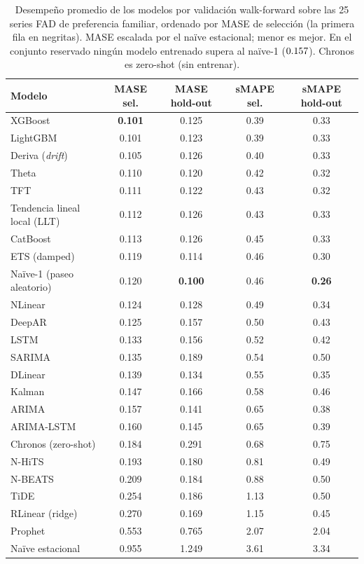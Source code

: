 \documentclass[12pt,letterpaper]{report}
\begin{document}
\begin{table}[H]
\centering
\footnotesize
\caption[Comparación de los \factNModels{} modelos]{Desempeño promedio de los \factNModels{} modelos por
validación walk-forward sobre las 25 series FAD de preferencia familiar, ordenado por MASE
de selección (la primera fila en negritas). MASE escalada por el naïve estacional; menor es
mejor. En el conjunto reservado ningún modelo entrenado supera al naïve-1 ($0.157$).
Chronos es zero-shot (sin entrenar).}
\label{tab:comparacion_modelos}
\begin{tabular}{lcccc}
\toprule
\rowcolor{uacjblue!15}
\textbf{Modelo} & \textbf{MASE sel.} & \textbf{MASE hold-out} & \textbf{sMAPE sel.} & \textbf{sMAPE hold-out} \\ \midrule
XGBoost & \textbf{0.101} & 0.125 & 0.39 & 0.33 \\
LightGBM & 0.101 & 0.123 & 0.39 & 0.33 \\
Deriva (\textit{drift}) & 0.105 & 0.126 & 0.40 & 0.33 \\
Theta & 0.110 & 0.120 & 0.42 & 0.32 \\
TFT & 0.111 & 0.122 & 0.43 & 0.32 \\
Tendencia lineal local (LLT) & 0.112 & 0.126 & 0.43 & 0.33 \\
CatBoost & 0.113 & 0.126 & 0.45 & 0.33 \\
ETS (damped) & 0.119 & 0.114 & 0.46 & 0.30 \\
\rowcolor{uacjyellow!25}
Naïve-1 (paseo aleatorio) & 0.120 & \textbf{0.100} & 0.46 & \textbf{0.26} \\
NLinear & 0.124 & 0.128 & 0.49 & 0.34 \\
DeepAR & 0.125 & 0.157 & 0.50 & 0.43 \\
LSTM & 0.133 & 0.156 & 0.52 & 0.42 \\
SARIMA & 0.135 & 0.189 & 0.54 & 0.50 \\
DLinear & 0.139 & 0.134 & 0.55 & 0.35 \\
Kalman & 0.147 & 0.166 & 0.58 & 0.46 \\
ARIMA & 0.157 & 0.141 & 0.65 & 0.38 \\
ARIMA-LSTM & 0.160 & 0.145 & 0.65 & 0.39 \\
Chronos (zero-shot) & 0.184 & 0.291 & 0.68 & 0.75 \\
N-HiTS & 0.193 & 0.180 & 0.81 & 0.49 \\
N-BEATS & 0.209 & 0.184 & 0.88 & 0.50 \\
TiDE & 0.254 & 0.186 & 1.13 & 0.50 \\
RLinear (ridge) & 0.270 & 0.169 & 1.15 & 0.45 \\
Prophet & 0.553 & 0.765 & 2.07 & 2.04 \\
Naïve estacional & 0.955 & 1.249 & 3.61 & 3.34 \\
\bottomrule
\end{tabular}
\end{table}
\end{document}
